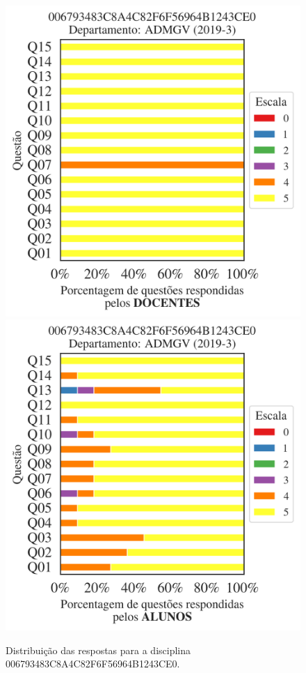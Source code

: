\documentclass[a4paper,10pt]{article}
\begin{document}
\begin{figure}[h]
\centering
\includegraphics[width=0.485\linewidth]{analise_disciplina_departamento_ADMGV_006793483C8A4C82F6F56964B1243CE0_docentes.png}
\includegraphics[width=0.485\linewidth]{analise_disciplina_departamento_ADMGV_006793483C8A4C82F6F56964B1243CE0_alunos.png}
\caption{\label{fig:analise_geral_departamento}                Distribuição das respostas para a disciplina 006793483C8A4C82F6F56964B1243CE0. }
\end{figure}
\end{document}
